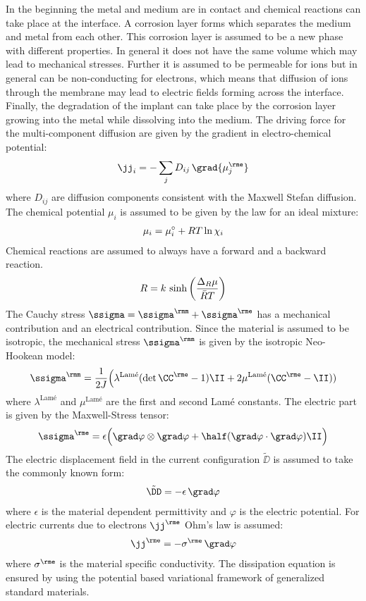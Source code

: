 In the beginning the metal and medium are in contact and chemical reactions can take place at the interface. A corrosion layer forms which separates the medium and metal from each other. This corrosion layer is assumed to be a new phase with different properties. In general it does not have the same volume which may lead to mechanical stresses. Further it is assumed to be permeable for ions but in general can be non-conducting for electrons, which means that diffusion of ions through the membrane may lead to electric fields forming across the interface. Finally, the degradation of the implant can take place by the corrosion layer growing into the metal while dissolving into the medium. The driving force for the multi-component diffusion are given by the gradient in electro-chemical potential:
\begin{align}
  \jj_i = -\sum_j D_{ij} \, \grad{\mu_j^\rme}
\end{align}
where $D_{ij}$ are diffusion components consistent with the Maxwell Stefan diffusion. The chemical potential $\mu_i$ is assumed to be given by the law for an ideal mixture: 
\begin{align}
  \mu_i = \mu_{i}^{\circ} + RT \ln{\chi_i}
\end{align}
Chemical reactions are assumed to always have a forward and a backward reaction. 
\begin{align}
  R = k\,\sinh\bigg(\frac{\Delta_R \mu}{\bar{R}T}\bigg)
\end{align}
The Cauchy stress $\ssigma=\ssigma^\rmm+\ssigma^\rme$ has a mechanical contribution and an electrical contribution. Since the material is assumed to be isotropic, the mechanical stress $\ssigma^\rmm$ is given by the isotropic Neo-Hookean model: 
\begin{align}
  \ssigma^\rmm = \frac{1}{2J} \Big( \lambda^{\text{Lam\'e}}(\det\CCe-1)\II+2\mu^{\text{Lam\'e}}(\CCe-\II))
\end{align}
where $\lambda^{\text{Lam\'e}}$ and $\mu^{\text{Lam\'e}}$ are the first and second Lam\'e constants.
The electric part is given by the Maxwell-Stress tensor:
\begin{align}
  \ssigma^\rme = \epsilon \Big(\grad\varphi \otimes \grad\varphi + \half (\grad\varphi \cdot \grad\varphi) \II \Big)
\end{align}
The electric displacement field in the current configuration $\tilde \DD$ is assumed to take the commonly known form: 
\begin{align}
  \tilde\DD = -\epsilon \, \grad \varphi
\end{align}
where $\epsilon$ is the material dependent permittivity and $\varphi$ is the electric potential. For electric currents due to electrons $\jj^\rme$ Ohm's law is assumed:
\begin{align}
  \jj^\rme = -\sigma^\rme \, \grad \varphi
\end{align}
where $\sigma^\rme$ is the material specific conductivity.
The dissipation equation is ensured by using the potential based variational framework of generalized standard materials.  
